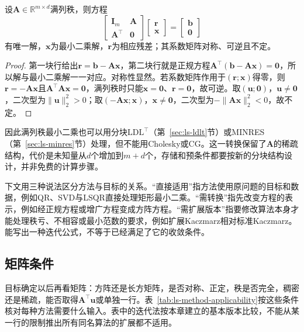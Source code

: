 \begin{theorem}[最小二乘的增广方程]
\label{thm:ls-augmented-kkt-system}
设$\bm A\in\mathbb R^{m\times d}$满列秩，则方程
\[
 \begin{bmatrix}\bm I_m&\bm A\\ \bm A^\top&\bm0\end{bmatrix}
 \begin{bmatrix}\bm r\\ \bm x\end{bmatrix}
 =\begin{bmatrix}\bm b\\ \bm0\end{bmatrix}
\]
有唯一解，$\bm x$为最小二乘解，$\bm r$为相应残差；其系数矩阵对称、可逆且不定。
\end{theorem}
\begin{proof}
第一块行给出$\bm r=\bm b-\bm A\bm x$，第二块行就是正规方程$\bm A^\top(\bm b-\bm A\bm x)=\bm0$，所以解与最小二乘解一一对应。对称性显然。若系数矩阵作用于$(\bm r;\bm x)$得零，则$\bm r=-\bm A\bm x$且$\bm A^\top\bm A\bm x=\bm0$，满列秩时只能$\bm x=\bm0$、$\bm r=\bm0$，故可逆。取$(\bm u;\bm0)$，$\bm u\ne\bm0$，二次型为$\lVert\bm u\rVert_2^2>0$；取$(-\bm A\bm x;\bm x)$，$\bm x\ne\bm0$，二次型为$-\lVert\bm A\bm x\rVert_2^2<0$，故不定。
\end{proof}

因此满列秩最小二乘也可以用分块$\mathrm{LDL}^\top$（第~\ref{sec:ls-ldlt}节）或MINRES（第~\ref{sec:ls-minres}节）处理，但不能用Cholesky或CG。这一转换保留了$\bm A$的稀疏结构，代价是未知量从$d$个增加到$m+d$个，存储和预条件都要按新的分块结构设计，并非免费的计算步骤。

下文用三种说法区分方法与目标的关系。“直接适用”指方法使用原问题的目标和数据，例如QR、SVD与LSQR直接处理矩形最小二乘。“需转换”指先改变方程的表示，例如经正规方程或增广方程变成方阵方程。“需扩展版本”指要修改算法本身才能处理秩亏、不相容或最小范数的要求，例如扩展Kaczmarz相对标准Kaczmarz。能写出一种迭代公式，不等于已经满足了它的收敛条件。

\subsection{矩阵条件}
\label{sec:ls-method-selection-matrix}

目标确定以后再看矩阵：方阵还是长方矩阵，是否对称、正定，秩是否完全，稠密还是稀疏，能否取得$\bm A^\top\bm u$或单独一行。表~\ref{tab:ls-method-applicability}按这些条件核对每种方法需要什么输入。表中的迭代法按本章建立的基本版本比较，不能从某一行的限制推出所有同名算法的扩展都不适用。

